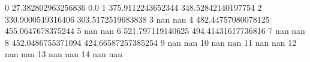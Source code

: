 0 27.382802963256836 0.0
1 375.9112243652344 348.52842140197754
2 330.9000549316406 303.5172519683838
3 nan nan
4 482.44757080078125 455.0647678375244
5 nan nan
6 521.797119140625 494.41431617736816
7 nan nan
8 452.0486755371094 424.66587257385254
9 nan nan
10 nan nan
11 nan nan
12 nan nan
13 nan nan
14 nan nan
